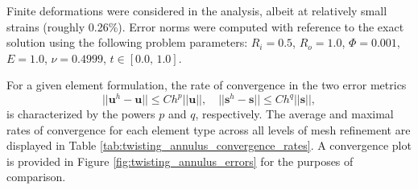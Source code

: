 Finite deformations were considered in the analysis, albeit at relatively small strains (roughly 0.26\%). Error norms were computed with reference to the exact solution using the following problem parameters: $R_i = 0.5$, $R_o = 1.0$, $\Phi = 0.001$, $E = 1.0$, $\nu = 0.4999$, $t \in [0.0, \, 1.0]$.

For a given element formulation, the rate of convergence in the two error metrics
\begin{equation}
	|| \mathbf{u}^h - \mathbf{u} || \leq C h^p || \mathbf{u} ||, \quad || \mathbf{s}^h - \mathbf{s} || \leq C h^q || \mathbf{s} ||,
\end{equation}
is characterized by the powers $p$ and $q$, respectively. The average and maximal rates of convergence for each element type across all levels of mesh refinement are displayed in Table \ref{tab:twisting_annulus_convergence_rates}. A convergence plot is provided in Figure \ref{fig:twisting_annulus_errors} for the purposes of comparison.


